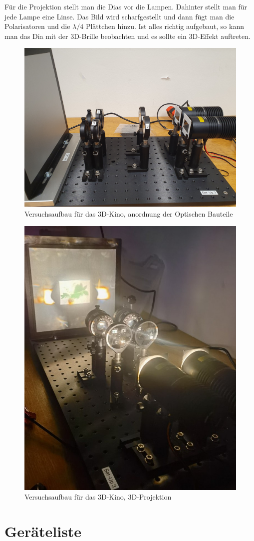 \documentclass[12pt,a4paper,twoside]{article}
\begin{document}
\noindent
Für die Projektion stellt man die Dias vor die Lampen. Dahinter stellt man für jede Lampe eine Linse. 
Das Bild wird scharfgestellt und dann fügt man die Polarisatoren und die $\lambda/4$ Plättchen hinzu. 
Ist alles richtig aufgebaut, so kann man das Dia mit der 3D-Brille beobachten und es sollte ein 3D-Effekt auftreten. 

\begin{figure}[H]
    \centering
    \includegraphics[width=0.6\linewidth]{nudes/3d kino aufbau hell.jpg}
    \caption{Versuchsaufbau für das 3D-Kino, anordnung der Optischen Bauteile}
    \label{fig:3D Kino aufbau}
\end{figure}

\begin{figure}[H]
    \centering
    \includegraphics[width=0.6\linewidth]{nudes/3d kino aufbau.jpg}
    \caption{Versuchsaufbau für das 3D-Kino, 3D-Projektion}
    \label{fig:3D Kino projektion}
\end{figure}

\section{Geräteliste} %
\end{document}
